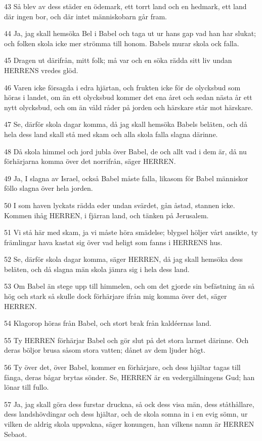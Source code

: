 \par 43 Så blev av dess städer en ödemark, ett torrt land och en hedmark, ett land där ingen bor, och där intet människobarn går fram.
\par 44 Ja, jag skall hemsöka Bel i Babel och taga ut ur hans gap vad han har slukat; och folken skola icke mer strömma till honom. Babels murar skola ock falla.
\par 45 Dragen ut därifrån, mitt folk; må var och en söka rädda sitt liv undan HERRENS vredes glöd.
\par 46 Varen icke försagda i edra hjärtan, och frukten icke för de olycksbud som höras i landet, om än ett olycksbud kommer det ena året och sedan nästa år ett nytt olycksbud, och om än våld råder på jorden och härskare står mot härskare.
\par 47 Se, därför skola dagar komma, då jag skall hemsöka Babels beläten, och då hela dess land skall stå med skam och alla skola falla slagna därinne.
\par 48 Då skola himmel och jord jubla över Babel, de och allt vad i dem är, då nu förhärjarna komma över det norrifrån, säger HERREN.
\par 49 Ja, I slagna av Israel, också Babel måste falla, likasom för Babel människor föllo slagna över hela jorden.
\par 50 I som haven lyckats rädda eder undan svärdet, gån åstad, stannen icke. Kommen ihåg HERREN, i fjärran land, och tänken på Jerusalem.
\par 51 Vi stå här med skam, ja vi måste höra smädelse; blygsel höljer vårt ansikte, ty främlingar hava kastat sig över vad heligt som fanns i HERRENS hus.
\par 52 Se, därför skola dagar komma, säger HERREN, då jag skall hemsöka dess beläten, och då slagna män skola jämra sig i hela dess land.
\par 53 Om Babel än stege upp till himmelen, och om det gjorde sin befästning än så hög och stark så skulle dock förhärjare ifrån mig komma över det, säger HERREN.
\par 54 Klagorop höras från Babel, och stort brak från kaldéernas land.
\par 55 Ty HERREN förhärjar Babel och gör slut på det stora larmet därinne. Och deras böljor brusa såsom stora vatten; dånet av dem ljuder högt.
\par 56 Ty över det, över Babel, kommer en förhärjare, och dess hjältar tagas till fånga, deras bågar brytas sönder. Se, HERREN är en vedergällningens Gud; han lönar till fullo.
\par 57 Ja, jag skall göra dess furstar druckna, så ock dess visa män, dess ståthållare, dess landshövdingar och dess hjältar, och de skola somna in i en evig sömn, ur vilken de aldrig skola uppvakna, säger konungen, han vilkens namn är HERREN Sebaot.
